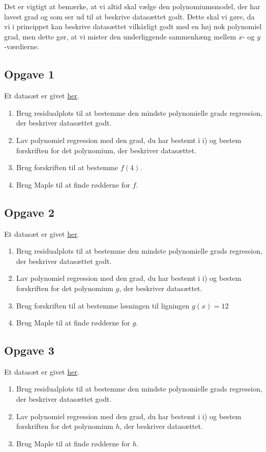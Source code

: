 Det er vigtigt at bemærke, at vi altid skal vælge den polynomiumsmodel, der har lavest grad og som ser ud til at beskrive datasættet godt. Dette skal vi gøre, da vi i princippet kan beskrive datasættet vilkårligt godt med en høj nok polynomiel grad, men dette gør, at vi mister den underliggende sammenhæng mellem $x$- og $y$-værdierne. 

\subsection*{Opgave 1}
	Et datasæt er givet \href{https://github.com/ChristianJLex/TeachingNotes/raw/master/2023-2024/Data og lign/poly_opgave1.xlsx}{\color{blue!60} her}.
	\begin{enumerate}[label=\roman*)]
		\item Brug residualplots til at bestemme den mindste polynomielle grads regression, 
		der beskriver datasættet godt. 
		\item Lav polynomiel regression med den grad, du har bestemt i i) og bestem 
		forskriften for det polynomium, der beskriver datasættet.
		\item Brug forskriften til at bestemme $f(4)$.
		\item Brug Maple til at finde rødderne for $f$.
	\end{enumerate}
\subsection*{Opgave 2}
	Et datasæt er givet \href{https://github.com/ChristianJLex/TeachingNotes/raw/master/2023-2024/Data og lign/poly_opgave2.xlsx}{\color{blue!60} her}.
	\begin{enumerate}[label=\roman*)]
		\item Brug residualplots til at bestemme den mindste polynomielle grads regression, 
		der beskriver datasættet godt. 
		\item Lav polynomiel regression med den grad, du har bestemt i i) og bestem 
		forskriften for det polynomium $g$, der beskriver datasættet.
		\item Brug forskriften til at bestemme løsningen til ligningen $g(x)=12$
		\item Brug Maple til at finde rødderne for $g$.
	\end{enumerate}
	
\subsection*{Opgave 3}
	Et datasæt er givet \href{https://github.com/ChristianJLex/TeachingNotes/raw/master/2023-2024/Data og lign/poly_opgave3.xlsx}{\color{blue!60} her}.
	\begin{enumerate}[label=\roman*)]
		\item Brug residualplots til at bestemme den mindste polynomielle grads regression, 
		der beskriver datasættet godt. 
		\item Lav polynomiel regression med den grad, du har bestemt i i) og bestem 
		forskriften for det polynomium $h$, der beskriver datasættet.
		\item Brug Maple til at finde rødderne for $h$.
	\end{enumerate}

